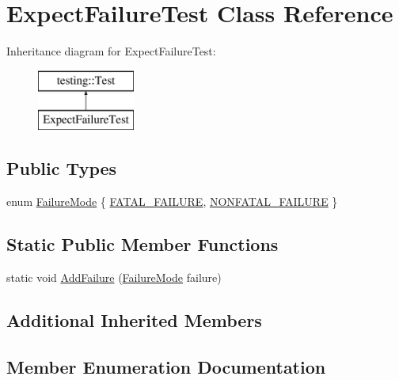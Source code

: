 \hypertarget{class_expect_failure_test}{}\section{Expect\+Failure\+Test Class Reference}
\label{class_expect_failure_test}
Inheritance diagram for Expect\+Failure\+Test\+:\begin{figure}[H]
\begin{center}
\leavevmode
\includegraphics[height=2.000000cm]{class_expect_failure_test}
\end{center}
\end{figure}
\subsection*{Public Types}
\begin{DoxyCompactItemize}
\item 
enum \hyperlink{class_expect_failure_test_aad05da10bb15d21a434eba3b37011406}{Failure\+Mode} \{ \hyperlink{class_expect_failure_test_aad05da10bb15d21a434eba3b37011406a3d618496b7e2a2c256e02186bddee4ec}{F\+A\+T\+A\+L\+\_\+\+F\+A\+I\+L\+U\+R\+E}, 
\hyperlink{class_expect_failure_test_aad05da10bb15d21a434eba3b37011406aeabdbecc0c4550d4f46cd44ac62fb92b}{N\+O\+N\+F\+A\+T\+A\+L\+\_\+\+F\+A\+I\+L\+U\+R\+E}
 \}
\end{DoxyCompactItemize}
\subsection*{Static Public Member Functions}
\begin{DoxyCompactItemize}
\item 
static void \hyperlink{class_expect_failure_test_ab9aeb7820ff7953fc2975ecc5abd046b}{Add\+Failure} (\hyperlink{class_expect_failure_test_aad05da10bb15d21a434eba3b37011406}{Failure\+Mode} failure)
\end{DoxyCompactItemize}
\subsection*{Additional Inherited Members}


\subsection{Member Enumeration Documentation}
\hypertarget{class_expect_failure_test_aad05da10bb15d21a434eba3b37011406}{}
